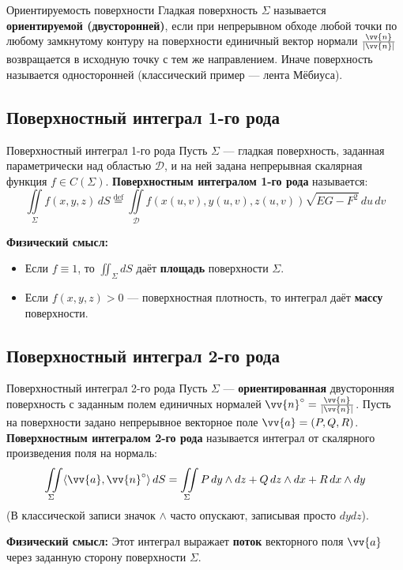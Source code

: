 \documentclass[12pt,a4paper]{article}
\begin{document}
\begin{Definition}{Ориентируемость поверхности}{}
Гладкая поверхность $\Sigma$ называется \textbf{ориентируемой (двусторонней)}, если при непрерывном обходе любой точки по любому замкнутому контуру на поверхности единичный вектор нормали $\frac{\vv{n}}{|\vv{n}|}$ возвращается в исходную точку с тем же направлением. 
Иначе поверхность называется односторонней (классический пример — лента Мёбиуса).
\end{Definition}

\subsection{Поверхностный интеграл 1-го рода}

\begin{Definition}{Поверхностный интеграл 1-го рода}{}
Пусть $\Sigma$ — гладкая поверхность, заданная параметрически над областью $\mathscr{D}$, и на ней задана непрерывная скалярная функция $f \in C(\Sigma)$. 
\textbf{Поверхностным интегралом 1-го рода} называется:
$$ \iint\limits_\Sigma f(x,y,z) \, dS \stackrel{\text{def}}{=} \iint\limits_{\mathscr{D}} f(x(u,v), y(u,v), z(u,v)) \sqrt{EG - F^2} \, du \, dv $$
\end{Definition}
\textbf{Физический смысл:}
\begin{itemize}
    \item Если $f \equiv 1$, то $\iint_\Sigma dS$ даёт \textbf{площадь} поверхности $\Sigma$.
    \item Если $f(x,y,z) > 0$ — поверхностная плотность, то интеграл даёт \textbf{массу} поверхности.
\end{itemize}

\subsection{Поверхностный интеграл 2-го рода}

\begin{Definition}{Поверхностный интеграл 2-го рода}{}
Пусть $\Sigma$ — \textbf{ориентированная} двусторонняя поверхность с заданным полем единичных нормалей $\vv{n}^\circ = \frac{\vv{n}}{|\vv{n}|}$. Пусть на поверхности задано непрерывное векторное поле $\vv{a} = (P, Q, R)$.
\textbf{Поверхностным интегралом 2-го рода} называется интеграл от скалярного произведения поля на нормаль:
$$ \iint\limits_\Sigma \langle \vv{a}, \vv{n}^\circ \rangle \, dS = \iint\limits_\Sigma P \, dy \wedge dz + Q \, dz \wedge dx + R \, dx \wedge dy $$
(В классической записи значок $\wedge$ часто опускают, записывая просто $dy dz$).
\end{Definition}
\textbf{Физический смысл:} Этот интеграл выражает \textbf{поток} векторного поля $\vv{a}$ через заданную сторону поверхности $\Sigma$.
\end{document}

